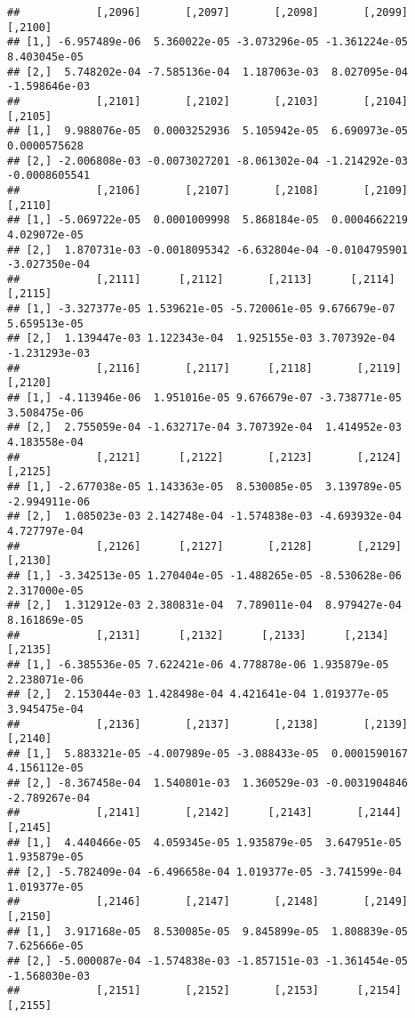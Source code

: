 \documentclass[
]{article}
\begin{document}
\begin{verbatim}
##            [,2096]       [,2097]       [,2098]       [,2099]       [,2100]
## [1,] -6.957489e-06  5.360022e-05 -3.073296e-05 -1.361224e-05  8.403045e-05
## [2,]  5.748202e-04 -7.585136e-04  1.187063e-03  8.027095e-04 -1.598646e-03
##            [,2101]       [,2102]       [,2103]       [,2104]       [,2105]
## [1,]  9.988076e-05  0.0003252936  5.105942e-05  6.690973e-05  0.0000575628
## [2,] -2.006808e-03 -0.0073027201 -8.061302e-04 -1.214292e-03 -0.0008605541
##            [,2106]       [,2107]       [,2108]       [,2109]       [,2110]
## [1,] -5.069722e-05  0.0001009998  5.868184e-05  0.0004662219  4.029072e-05
## [2,]  1.870731e-03 -0.0018095342 -6.632804e-04 -0.0104795901 -3.027350e-04
##            [,2111]      [,2112]       [,2113]      [,2114]       [,2115]
## [1,] -3.327377e-05 1.539621e-05 -5.720061e-05 9.676679e-07  5.659513e-05
## [2,]  1.139447e-03 1.122343e-04  1.925155e-03 3.707392e-04 -1.231293e-03
##            [,2116]       [,2117]      [,2118]       [,2119]      [,2120]
## [1,] -4.113946e-06  1.951016e-05 9.676679e-07 -3.738771e-05 3.508475e-06
## [2,]  2.755059e-04 -1.632717e-04 3.707392e-04  1.414952e-03 4.183558e-04
##            [,2121]      [,2122]       [,2123]       [,2124]       [,2125]
## [1,] -2.677038e-05 1.143363e-05  8.530085e-05  3.139789e-05 -2.994911e-06
## [2,]  1.085023e-03 2.142748e-04 -1.574838e-03 -4.693932e-04  4.727797e-04
##            [,2126]      [,2127]       [,2128]       [,2129]      [,2130]
## [1,] -3.342513e-05 1.270404e-05 -1.488265e-05 -8.530628e-06 2.317000e-05
## [2,]  1.312912e-03 2.380831e-04  7.789011e-04  8.979427e-04 8.161869e-05
##            [,2131]      [,2132]      [,2133]      [,2134]      [,2135]
## [1,] -6.385536e-05 7.622421e-06 4.778878e-06 1.935879e-05 2.238071e-06
## [2,]  2.153044e-03 1.428498e-04 4.421641e-04 1.019377e-05 3.945475e-04
##            [,2136]       [,2137]       [,2138]       [,2139]       [,2140]
## [1,]  5.883321e-05 -4.007989e-05 -3.088433e-05  0.0001590167  4.156112e-05
## [2,] -8.367458e-04  1.540801e-03  1.360529e-03 -0.0031904846 -2.789267e-04
##            [,2141]       [,2142]      [,2143]       [,2144]      [,2145]
## [1,]  4.440466e-05  4.059345e-05 1.935879e-05  3.647951e-05 1.935879e-05
## [2,] -5.782409e-04 -6.496658e-04 1.019377e-05 -3.741599e-04 1.019377e-05
##            [,2146]       [,2147]       [,2148]       [,2149]       [,2150]
## [1,]  3.917168e-05  8.530085e-05  9.845899e-05  1.808839e-05  7.625666e-05
## [2,] -5.000087e-04 -1.574838e-03 -1.857151e-03 -1.361454e-05 -1.568030e-03
##            [,2151]       [,2152]       [,2153]      [,2154]       [,2155]

\end{verbatim}
\end{document}
